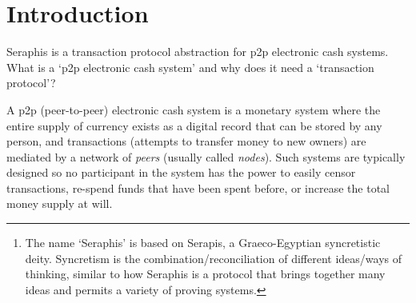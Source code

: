 \begin{abstract}
    Seraphis\footnote{The name `Seraphis' is based on Serapis, a Graeco-Egyptian syncretistic deity. Syncretism is the combination/reconciliation of different ideas/ways of thinking, similar to how Seraphis is a protocol that brings together many ideas and permits a variety of proving systems.} is a privacy-focused transaction protocol abstraction for p2p electronic cash systems that use the transaction output model (the {\em e-note} model in this paper). Seraphis e-notes are amount-transfer devices in the RingCT tradition, which record an `amount' as a Pedersen commitment, and an `address with transfer-authority' as a specially-designed prime-order group point (similar to CryptoNote one-time addresses). Unlike previous protocols compatible with CT (Confidential Transactions), where e-note membership, ownership, and unspentness proofs were highly integrated into one large proving structure (such as MLSAG or CLSAG in the case of standard RingCT), Seraphis separates membership proofs from ownership and unspentness proofs. This allows the security model for membership proofs to be abstracted away from any specific proving system, which both allows relatively simpler proving structures to be used, and greatly simplifies the overall security model of Seraphis compared to its predecessors. Doing so also allows a linking tag (a.k.a.\ key image) construction with a number of favorable properties. Most notably, implementers of Seraphis can use an addressing scheme which permits wallets with three tiers of permissions (view received amounts, full balance recovery, full balance recovery with spend authority). The second permission tier is unique to Seraphis among protocols in the CryptoNote tradition.
\end{abstract}


\section{Introduction}
\label{sec:introduction}

Seraphis is a transaction protocol abstraction for p2p electronic cash systems. What is a `p2p electronic cash system' and why does it need a `transaction protocol'?

A p2p (peer-to-peer) electronic cash system is a monetary system where the entire supply of currency exists as a digital record that can be stored by any person, and transactions (attempts to transfer money to new owners) are mediated by a network of {\em peers} (usually called {\em nodes}). Such systems are typically designed so no participant in the system has the power to easily censor transactions, re-spend funds that have been spent before, or increase the total money supply at will.


